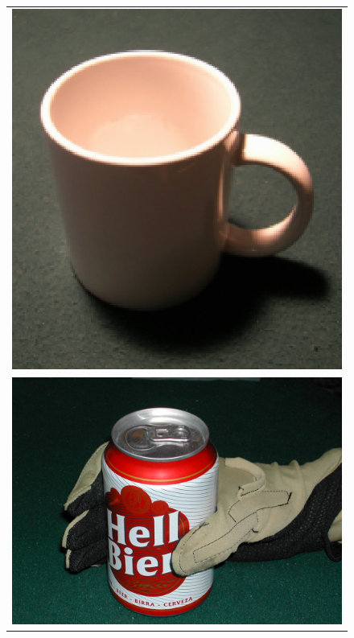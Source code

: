 \begin{figure}[!ht]
\begin{center}
\begin{tabular}{c}
      \includegraphics[height=0.08\textheight]{figs/grasping/mug.jpg} \\
      \includegraphics[height=0.08\textheight]{figs/grasping/grasp1.jpg}

\end{tabular}
\end{center}
\end{figure}
